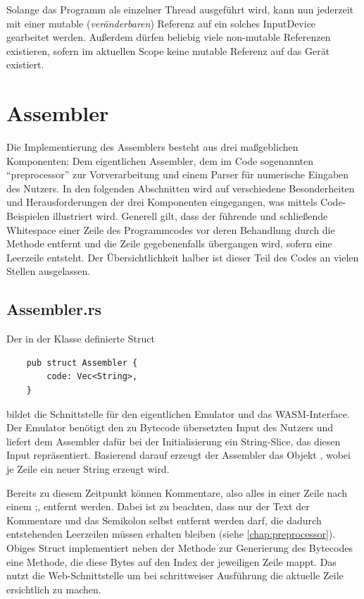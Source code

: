 \qquad{}

Solange das Programm als einzelner Thread ausgeführt wird, kann nun jederzeit mit einer mutable (\textit{veränderbaren}) Referenz auf ein solches InputDevice gearbeitet werden. Außerdem dürfen beliebig viele non-mutable Referenzen existieren, sofern im aktuellen Scope keine mutable Referenz auf das Gerät existiert.

\section{Assembler}

Die Implementierung des Assemblers besteht aus drei maßgeblichen Komponenten: Dem eigentlichen Assembler, dem im Code sogenannten \enquote{preprocessor} zur Vorverarbeitung und einem Parser für numerische Eingaben des Nutzers. In den folgenden Abschnitten wird auf verschiedene Besonderheiten und Herausforderungen der drei Komponenten eingegangen, was mittels Code-Beispielen illustriert wird. Generell gilt, dass der führende und schließende Whitespace einer Zeile des Programmcodes vor deren Behandlung durch die Methode  entfernt und die Zeile gegebenenfalls übergangen wird, sofern eine Leerzeile entsteht. Der Übersichtlichkeit halber ist dieser Teil des Codes an vielen Stellen ausgelassen.

\subsection{Assembler.rs}

Der in der Klasse  definierte Struct 
\begin{verbatim}
    pub struct Assembler {
        code: Vec<String>,
    }
\end{verbatim}
bildet die Schnittstelle für den eigentlichen Emulator und das \ac{WASM}-Interface. Der Emulator benötigt den zu Bytecode übersetzten Input des Nutzers und liefert dem Assembler dafür bei der Initialisierung ein String-Slice, das diesen Input repräsentiert. Basierend darauf erzeugt der Assembler das Objekt , wobei je Zeile ein neuer String erzeugt wird. 

Bereits zu diesem Zeitpunkt können Kommentare, also alles in einer Zeile nach einem \glqq ;\grqq, entfernt werden. Dabei ist zu beachten, dass nur der Text der Kommentare und das Semikolon selbst entfernt werden darf, die dadurch entstehenden Leerzeilen müssen erhalten bleiben (siehe \ref{chap:preprocessor}). Obiges Struct implementiert neben der Methode  zur Generierung des Bytecodes eine Methode, die diese Bytes auf den Index der jeweiligen Zeile mappt. Das nutzt die Web-Schnittstelle um bei schrittweiser Ausführung die aktuelle Zeile ersichtlich zu machen.

